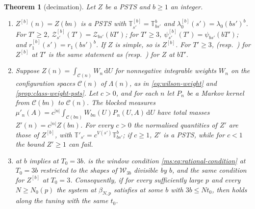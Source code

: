 \documentclass[11pt,a4paper]{amsart}
\newtheorem{theorem}{Theorem}[section]
\theoremstyle{definition}
\theoremstyle{remark}
\numberwithin{equation}{section}
\newcommand{\Wwin}{\mathcal{W}}      %
\newcommand{\dd}{\,\mathrm{d}}             %
\newcommand{\PSTS}{\textup{PSTS}}          %
\newcommand{\TT}{\mathbb{T}}               %
\newcommand{\Zc}{\mathcal{Z}}              %
\newcommand{\Zs}[2]{\Zc_{#1}(#2)}          %
\newcommand{\psiT}[2]{\psi_{#1}(#2)}       %
\newcommand{\Vol}[1]{V(#1)}                %
\newcommand{\lzero}{\lambda_0}             %
\newcommand{\Mcirc}{\text{\upshape(M$^{\circ}$)}}   %
\newcommand{\Bcirc}{\text{\upshape(B$^{\circ}$)}}   %
\newcommand{\CW}{\text{\upshape(CW)}}               %
\newcommand{\tzero}{t_0}                   %
\newcommand{\betaNp}{\beta_{N,p}}          %
\begin{document}
\begin{theorem}[decimation]\label{thm:decimation}
Let $Z$ be a \PSTS{} and $b\ge1$ an integer.
\begin{enumerate}[label=(\alph*)]
\item $Z^{[b]}(n)=Z(bn)$ is a \PSTS{} with $\TT^{[b]}_{s'}=\TT_{bs'}^b$ and $\lzero^{[b]}(s')=\lzero(bs')^b$. For $T'\ge2$, $\Zc^{[b]}_{s'}(T')=\Zs{bs'}{bT'}$; for $T'\ge3$, $\psi^{[b]}_{s'}(T')=\psiT{bs'}{bT'}$; and $r^{[b]}_1(s')=r_1(bs')^b$. If $Z$ is simple, so is $Z^{[b]}$. For $T'\ge3$, \Mcirc{} \textup{(}resp.\ \Bcirc{}\textup{)} for $Z^{[b]}$ at $T'$ is the same statement as \Mcirc{} \textup{(}resp.\ \Bcirc{}\textup{)} for $Z$ at $bT'$.
\item Suppose $Z(n)=\int_{\mathcal{C}(n)}W_n\dd U$ for nonnegative integrable weights $W_n$ on the configuration spaces $\mathcal{C}(n)$ of $\Lambda(n)$, as in \eqref{eq:wilson-weight} and \cref{prop:class-weight-psts}. Let $c>0$, and for each $n$ let $P_n$ be a Markov kernel from $\mathcal{C}(bn)$ to $\mathcal{C}(n)$. The blocked measures $\mu'_n(A)=c^{|n|}\int_{\mathcal{C}(bn)}W_{bn}(U)P_n(U,A)\dd U$ have total masses $Z'(n)=c^{|n|}Z(bn)$. For every $c>0$ the normalised quantities of $Z'$ are those of $Z^{[b]}$, with $\TT'_{s'}=c^{\Vol{s'}}\TT_{bs'}^b$; if $c\ge1$, $Z'$ is a \PSTS{}, while for $c<1$ the bound $Z'\ge1$ can fail.
\item \CW{} at $b$ implies \Mcirc{} at $T_0=3b$. \CW{} is the window condition \eqref{ms:eq:rational-condition} at $T_0=3b$ restricted to the shapes of $\Wwin_{3b}$ divisible by $b$, and the same condition for $Z^{[b]}$ at $T_0=3$. Consequently, if for every sufficiently large $p$ and every $N\ge N_0(p)$ the system at $\betaNp$ satisfies \CW{} at some $b$ with $3b\le N\tzero$, then \Mcirc{} holds along the tuning with the same $\tzero$.
\end{enumerate}
\end{theorem}
\end{document}
